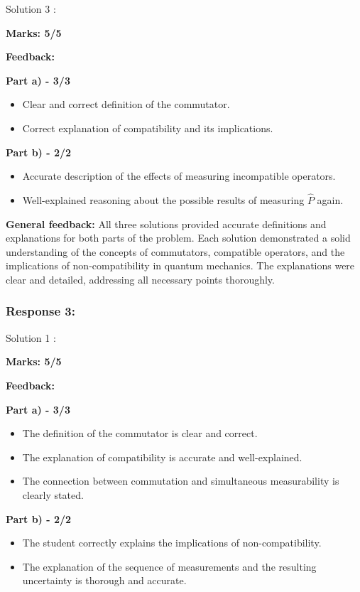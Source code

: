 \documentclass[a4paper,11pt]{article}
\begin{document}
Solution 3 :

\textbf{Marks: 5/5}

\textbf{Feedback:}

\textbf{Part a) - 3/3}

\begin{itemize}
    \item Clear and correct definition of the commutator.
    \item Correct explanation of compatibility and its implications.
\end{itemize}

\textbf{Part b) - 2/2}

\begin{itemize}
    \item Accurate description of the effects of measuring incompatible operators.
    \item Well-explained reasoning about the possible results of measuring $\hat{P}$ again.
\end{itemize}


\textbf{General feedback:}
All three solutions provided accurate definitions and explanations for both parts of the problem. Each solution demonstrated a solid understanding of the concepts of commutators, compatible operators, and the implications of non-compatibility in quantum mechanics. The explanations were clear and detailed, addressing all necessary points thoroughly.




\subsubsection*{Response 3:}

Solution 1 :

\textbf{Marks: 5/5}

\textbf{Feedback:}

\textbf{Part a) - 3/3}

\begin{itemize}
    \item The definition of the commutator is clear and correct.
    \item The explanation of compatibility is accurate and well-explained.
    \item The connection between commutation and simultaneous measurability is clearly stated.
\end{itemize}

\textbf{Part b) - 2/2}

\begin{itemize}
    \item The student correctly explains the implications of non-compatibility.
    \item The explanation of the sequence of measurements and the resulting uncertainty is thorough and accurate.
\end{itemize}
\end{document}
